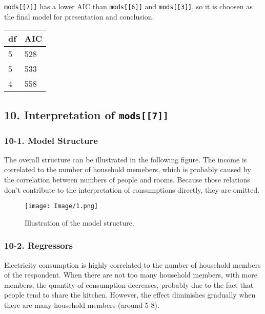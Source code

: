 \documentclass[main.tex]{subfiles}
\begin{document}
\texttt{mods{[}{[}7{]}{]}} has a lower AIC than
\texttt{mods{[}{[}6{]}{]}} and \texttt{mods{[}{[}3{]}{]}}, so it is
choosen as the final model for presentation and conclusion.

\begin{table}[H]
\centering
\begin{tabular}{ll}
\toprule
df & AIC\\
\midrule
5 & 528\\
5 & 533\\
4 & 558\\
\bottomrule
\end{tabular}
\end{table}

\hypertarget{interpretation-of-mods7}{%
\subsection{\texorpdfstring{10. Interpretation of
\texttt{mods{[}{[}7{]}{]}}}{10. Interpretation of mods{[}{[}7{]}{]}}}\label{interpretation-of-mods7}}

\hypertarget{model-structure}{%
\subsubsection{10-1. Model Structure}\label{model-structure}}

The overall structure can be illustrated in the following figure. The
income is correlated to the number of household memebers, which is
probably caused by the correlation between numbers of people and rooms.
Because those relations don't contribute to the interpretation of
consumptions directly, they are omitted.

\begin{figure}
\centering
\texttt{[image: Image/1.png]}
\caption{Illustration of the model structure.}
\end{figure}

\hypertarget{regressors}{%
\subsubsection{10-2. Regressors}\label{regressors}}

Electricity consumption is highly correlated to the number of household
members of the respondent. When there are not too many household
members, with more members, the quantity of consumption decreases,
probably due to the fact that people tend to share the kitchen. However,
the effect diminishes gradually when there are many household members
(around 5-8).
\end{document}
